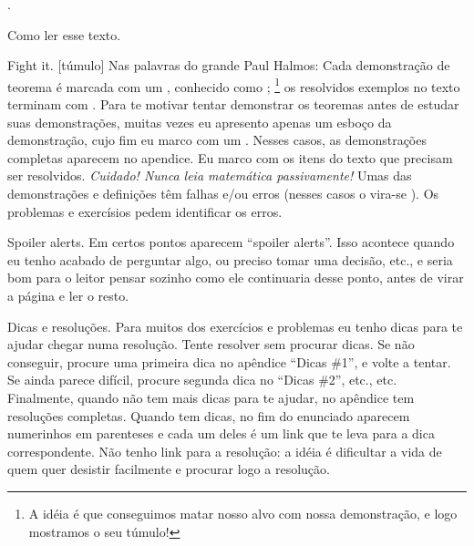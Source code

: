 
\chapteroid \prefacename.

\sectionoid Como ler esse texto.

\blah Fight it.
[túmulo]%
Nas palavras do grande Paul \Halmos{}Halmos:
\spoken
{}
\endspoken
Cada demonstração de teorema é marcada com um \symq{$\qedsymbol$},
conhecido como ;%
\footnote{A idéia é que conseguimos matar nosso alvo com nossa demonstração,
e logo mostramos o seu túmulo!}
os resolvidos exemplos no texto terminam com \symq{$\qexsymbol$}.
Para te motivar tentar demonstrar os teoremas antes de estudar suas demonstrações,
muitas vezes eu apresento apenas um esboço da demonstração,
cujo fim eu marco com um \symq{$\qessymbol$}.
Nesses casos, as demonstrações completas aparecem no apendice.
Eu marco com \symq{$\activitysymbol$} os itens do texto que
precisam ser resolvidos.
\endgraf
\emph{Cuidado! Nunca leia matemática passivamente!}
Umas das demonstrações e definições têm falhas e/ou erros
(nesses casos o \symq{$\qedsymbol$} vira-se \symq{$\mistakesymbol$}).
Os problemas e exercísios pedem identificar os erros.

\blah Spoiler alerts.
Em certos pontos aparecem ``spoiler alerts''.
Isso acontece quando eu tenho acabado de perguntar algo, ou preciso
tomar uma decisão, etc., e seria bom para o leitor pensar sozinho
como ele continuaria desse ponto, antes de virar a página
e ler o resto.

\blah Dicas e resoluções.
Para muitos dos exercícios e problemas eu tenho dicas para te ajudar
chegar numa resolução.  Tente resolver sem procurar dicas.
Se não conseguir, procure uma primeira dica no apêndice ``Dicas \#1'',
e volte a tentar.
Se ainda parece difícil, procure segunda dica no ``Dicas \#2'', etc., etc.
Finalmente, quando não tem mais dicas para te ajudar,
no apêndice tem resoluções completas.
Quando tem dicas, no fim do enunciado aparecem numerinhos em parenteses
e cada um deles é um link que te leva para a dica correspondente.
Não tenho link para a resolução: a idéia é dificultar a vida de quem
quer desistir facilmente e procurar logo a resolução.


